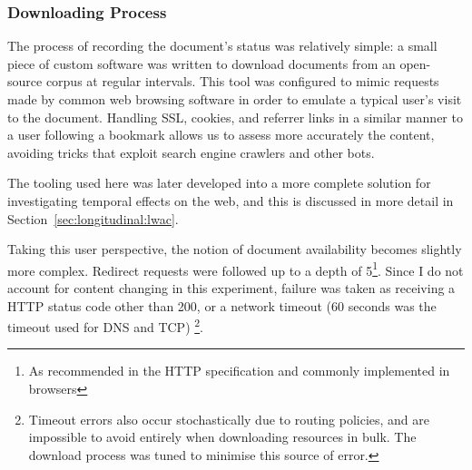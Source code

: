 








\subsubsection{Downloading Process}
The process of recording the document's status was relatively simple: a small piece of custom software was written to download documents from an open-source corpus at regular intervals.  This tool was configured to mimic requests made by common web browsing software in order to emulate a typical user's visit to the document. Handling SSL, cookies, and referrer links in a similar manner to a user following a bookmark allows us to assess more accurately the content, avoiding tricks that exploit search engine crawlers and other bots.

The tooling used here was later developed into a more complete solution for investigating temporal effects on the web, and this is discussed in more detail in Section~\ref{sec:longitudinal:lwac}.




Taking this user perspective, the notion of document availability becomes slightly more complex.  Redirect requests were followed up to a depth of 5\footnote{As recommended in the HTTP specification and commonly implemented in browsers}.  Since I do not account for content changing in this experiment, failure was taken as receiving a HTTP status code other than 200, or a network timeout (60 seconds was the timeout used for DNS and TCP)%
\footnote{Timeout errors also occur stochastically due to routing policies, and are impossible to avoid entirely when downloading resources in bulk.  The download process was tuned to minimise this source of error.}.

